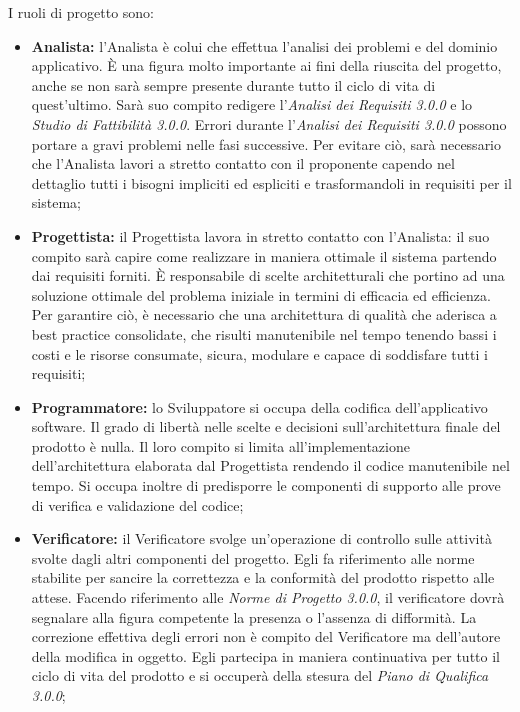    			\noindent I ruoli di progetto sono:
   			\begin{itemize}
   				\item \textbf{Analista:} l'Analista è colui che effettua l'analisi dei problemi e del dominio applicativo. È una figura molto importante ai fini della riuscita del progetto, anche se non sarà sempre presente durante tutto il ciclo di vita di quest'ultimo. Sarà suo compito redigere l'\textit{Analisi dei Requisiti 3.0.0\doc} e lo \textit{Studio di Fattibilità 3.0.0\doc}. Errori durante l'\textit{Analisi dei Requisiti 3.0.0\doc} possono portare a gravi problemi nelle fasi successive. Per evitare ciò, sarà necessario che l'Analista lavori a stretto contatto con il proponente capendo nel dettaglio tutti i bisogni impliciti ed espliciti e trasformandoli in requisiti per il sistema;
   				\item \textbf{Progettista:} il Progettista lavora in stretto contatto con l'Analista: il suo compito sarà capire come realizzare in maniera ottimale il sistema partendo dai requisiti forniti. È responsabile di scelte architetturali che portino ad una soluzione ottimale del problema iniziale in termini di efficacia ed efficienza. Per garantire ciò, è necessario che una architettura di qualità che aderisca a best practice consolidate, che risulti manutenibile nel tempo tenendo bassi i costi e le risorse consumate, sicura, modulare e capace di soddisfare tutti i requisiti;
   				\item \textbf{Programmatore:} lo Sviluppatore si occupa della codifica dell'applicativo software. Il grado di libertà nelle scelte e decisioni sull'architettura finale del prodotto è nulla. Il loro compito si limita all'implementazione dell'architettura elaborata dal Progettista rendendo il codice manutenibile nel tempo. Si occupa inoltre di predisporre le componenti di supporto alle prove di verifica e validazione del codice;
   				\item \textbf{Verificatore:} il Verificatore svolge un'operazione di controllo sulle attività svolte dagli altri componenti del progetto. Egli fa riferimento alle norme stabilite per sancire la correttezza e la conformità del prodotto rispetto alle attese. Facendo riferimento alle \textit{Norme di Progetto 3.0.0\doc}, il verificatore dovrà segnalare alla figura competente la presenza o l'assenza di difformità. La correzione effettiva degli errori non è compito del Verificatore ma dell'autore della modifica in oggetto. Egli partecipa in maniera continuativa per tutto il ciclo di vita del prodotto e si occuperà della stesura del \textit{Piano di Qualifica 3.0.0\docs};

\end{itemize}
